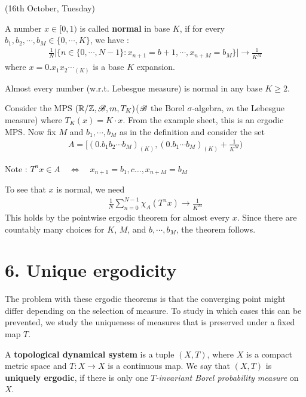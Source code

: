 \documentclass[12pt,a4paper]{report}
\newenvironment{proof}
{\begin{changemargin}{1cm}{0.5cm} 
	}%
	{\end{changemargin}
}
\begin{document}
\newday

(16th October, Tuesday)
\s

 A number $x\in [0,1)$ is called \textbf{normal} in base $K$, if for every $b_1, b_2, \cdots, b_M \in \{0,\cdots, K\}$, we have :
\begin{align*}
\frac{1}{N} \big| \{ n\in \{0,\cdots, N-1\}: x_{n+1} = b+1, \cdots, x_{n+M}= b_M  \} \big| \rightarrow \frac{1}{K^M}
\end{align*}
where $x = 0.x_1x_2\cdots_{(K)}$ is a base $K$ expansion.
\s

\thm Almost every number (w.r.t. Lebesgue measure) is normal in any base $K\geq 2$. 
\begin{proof}
\pf Consider the MPS $(\mathbb{R}/ \mathbb{Z},\mathscr{B}, m, T_K)$($\mathscr{B}$ the Borel $\sigma$-algebra, $m$ the Lebesgue measure) where $T_K(x) = K\cdot x$. From the example sheet, this is an ergodic MPS. Now fix $M$ and $b_1, \cdots, b_M$ as in the definition and consider the set
\begin{align*}
A = \Big[ (0.b_1 b_2 \cdots b_M)_{(K)}, (0.b_1\cdots b_M)_{(K)} + \frac{1}{K^M} \Big)
\end{align*}

\bull Note : $T^n x\in A \quad \Leftrightarrow \quad x_{n+1} = b_1, c\dots, x_{n+M} = b_M$

To see that $x$ is normal, we need
\begin{align*}
\frac{1}{N} \sum_{n=0}^{N-1} \chi_A(T^n x) \rightarrow \frac{1}{K^M}
\end{align*}
This holds by the pointwise ergodic theorem for almost every $x$. Since there are countably many choices for $K$, $M$, and $b,\cdots,b_M$, the theorem follows.

\eop
\end{proof}
\s

\section*{6. Unique ergodicity}

The problem with these ergodic theorems is that the converging point might differ depending on the selection of measure. To study in which cases this can be prevented, we study the uniqueness of measures that is preserved under a fixed map $T$.

\s
{} A \textbf{topological dynamical system} is a tuple $(X,T)$, where $X$ is a compact metric space and $T:X\rightarrow X$ is a continuous map. We say that $(X,T)$ is \textbf{uniquely ergodic}, if there is only one \emph{$T$-invariant Borel probability measure} on $X$.
\s
\end{document}
